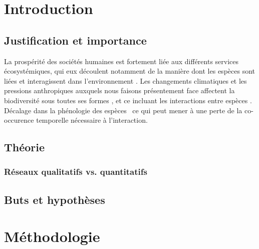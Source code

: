 \documentclass[french,12pt]{article}
\begin{document}


\tableofcontents
\newpage

\listoffigures
\listoftables
\newpage

\section{Introduction}
\subsection{Justification et importance}
La prospérité des sociétés humaines est fortement liée aux différents services écosystémiques, qui eux découlent notamment de la manière dont les espèces sont liées et interagissent dans l'environnement \citep{Daily1997EcoSer, Duffy2009WhyBio,Jordano2016ChaEco}. Les changements climatiques et les pressions anthropiques auxquels nous faisons présentement face affectent la biodiversité sous toutes ses formes \citep{DiazSumPol}, et ce incluant les interactions entre espèces \citep{Estes2011TroDow,Walther2010ComEco,Woodward2010CliCha}.
Décalage dans la phénologie des espèces \citep{Parmesan2003GloCoh} ce qui peut mener à une perte de la co-occurence temporelle nécessaire à l'interaction.

\subsection{Théorie}
\subsubsection{Réseaux qualitatifs vs. quantitatifs}

\subsection{Buts et hypothèses}

\section{Méthodologie} 

\pagebreak


\end{document}
